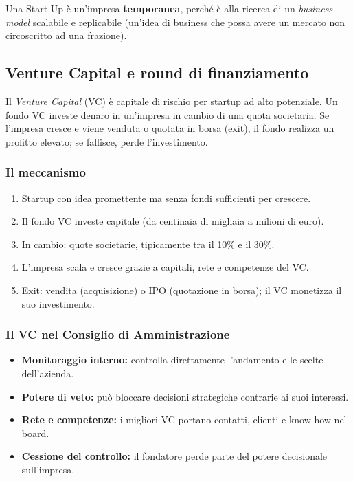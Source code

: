 \documentclass[a4paper,12pt]{article}
\begin{document}
	\begin{tcolorbox}[colback=blue!5,colframe=blue!75!black,title=Cos'è una Start-up?]
		Una Start-Up è un'impresa \textbf{temporanea}, perché è alla ricerca di un \textit{business model} scalabile e replicabile (un'idea di business che possa avere un mercato non circoscritto ad una frazione).
	\end{tcolorbox}
	
	\subsection{Venture Capital e round di finanziamento}
	
	Il \emph{Venture Capital} (VC) è capitale di rischio per startup ad alto potenziale.%
	Un fondo VC investe denaro in un'impresa in cambio di una quota societaria.%
	Se l'impresa cresce e viene venduta o quotata in borsa (exit), il fondo realizza un profitto elevato; se fallisce, perde l'investimento.
	
	\subsubsection{Il meccanismo}
	
	\begin{enumerate}
		\item Startup con idea promettente ma senza fondi sufficienti per crescere.
		\item Il fondo VC investe capitale (da centinaia di migliaia a milioni di euro).
		\item In cambio: quote societarie, tipicamente tra il 10\% e il 30\%.
		\item L'impresa scala e cresce grazie a capitali, rete e competenze del VC.
		\item Exit: vendita (acquisizione) o IPO (quotazione in borsa); il VC monetizza il suo investimento.
	\end{enumerate}
	
	\subsubsection{Il VC nel Consiglio di Amministrazione}
	
	\begin{itemize}
		\item \textbf{Monitoraggio interno:} controlla direttamente l'andamento e le scelte dell'azienda.
		\item \textbf{Potere di veto:} può bloccare decisioni strategiche contrarie ai suoi interessi.
		\item \textbf{Rete e competenze:} i migliori VC portano contatti, clienti e know-how nel board.
		\item \textbf{Cessione del controllo:} il fondatore perde parte del potere decisionale sull'impresa.
	\end{itemize}
	
\end{document}
